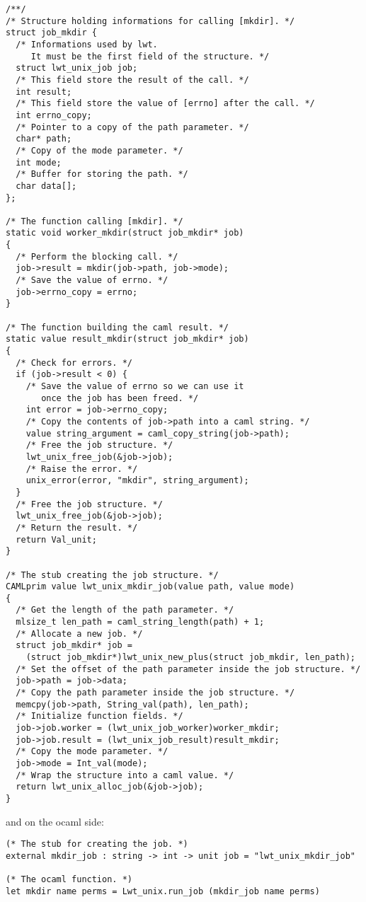 \lstset{language=c}\begin{lstlisting}/**/
/* Structure holding informations for calling [mkdir]. */
struct job_mkdir {
  /* Informations used by lwt.
     It must be the first field of the structure. */
  struct lwt_unix_job job;
  /* This field store the result of the call. */
  int result;
  /* This field store the value of [errno] after the call. */
  int errno_copy;
  /* Pointer to a copy of the path parameter. */
  char* path;
  /* Copy of the mode parameter. */
  int mode;
  /* Buffer for storing the path. */
  char data[];
};

/* The function calling [mkdir]. */
static void worker_mkdir(struct job_mkdir* job)
{
  /* Perform the blocking call. */
  job->result = mkdir(job->path, job->mode);
  /* Save the value of errno. */
  job->errno_copy = errno;
}

/* The function building the caml result. */
static value result_mkdir(struct job_mkdir* job)
{
  /* Check for errors. */
  if (job->result < 0) {
    /* Save the value of errno so we can use it
       once the job has been freed. */
    int error = job->errno_copy;
    /* Copy the contents of job->path into a caml string. */
    value string_argument = caml_copy_string(job->path);
    /* Free the job structure. */
    lwt_unix_free_job(&job->job);
    /* Raise the error. */
    unix_error(error, "mkdir", string_argument);
  }
  /* Free the job structure. */
  lwt_unix_free_job(&job->job);
  /* Return the result. */
  return Val_unit;
}

/* The stub creating the job structure. */
CAMLprim value lwt_unix_mkdir_job(value path, value mode)
{
  /* Get the length of the path parameter. */
  mlsize_t len_path = caml_string_length(path) + 1;
  /* Allocate a new job. */
  struct job_mkdir* job =
    (struct job_mkdir*)lwt_unix_new_plus(struct job_mkdir, len_path);
  /* Set the offset of the path parameter inside the job structure. */
  job->path = job->data;
  /* Copy the path parameter inside the job structure. */
  memcpy(job->path, String_val(path), len_path);
  /* Initialize function fields. */
  job->job.worker = (lwt_unix_job_worker)worker_mkdir;
  job->job.result = (lwt_unix_job_result)result_mkdir;
  /* Copy the mode parameter. */
  job->mode = Int_val(mode);
  /* Wrap the structure into a caml value. */
  return lwt_unix_alloc_job(&job->job);
}\end{lstlisting}
\medskip

\noindent
and on the ocaml side:



\lstset{language=[Objective]Caml}\begin{lstlisting}
(* The stub for creating the job. *)
external mkdir_job : string -> int -> unit job = "lwt_unix_mkdir_job"

(* The ocaml function. *)
let mkdir name perms = Lwt_unix.run_job (mkdir_job name perms)
\end{lstlisting}
\medskip

\noindent
